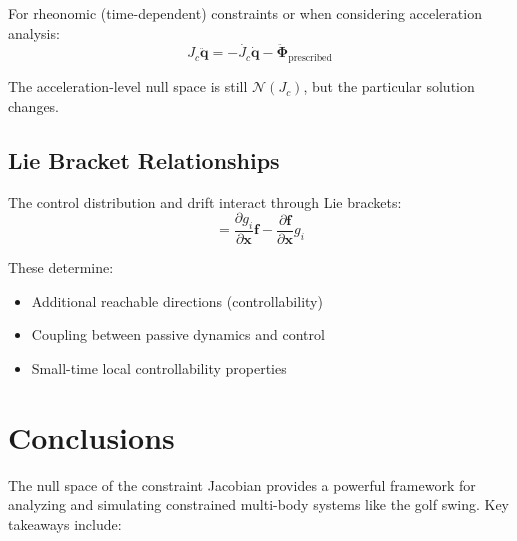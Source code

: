 \documentclass[11pt,a4paper]{article}
\theoremstyle{definition}
\newcommand{\nullspace}{\mathcal{N}}
\newcommand{\Jc}{J_c}
\newcommand{\qvec}{\bm{q}}
\newcommand{\xvec}{\bm{x}}
\newcommand{\fvec}{\bm{f}}
\newcommand{\Phivec}{\bm{\Phi}}
\begin{document}
For rheonomic (time-dependent) constraints or when considering acceleration analysis:
\begin{equation}
    \Jc \ddot{\qvec} = -\dot{\Jc} \dot{\qvec} - \ddot{\Phivec}_{\text{prescribed}}
\end{equation}

The acceleration-level null space is still $\nullspace(\Jc)$, but the particular solution changes.

\subsection{Lie Bracket Relationships}

The control distribution and drift interact through Lie brackets:
\begin{equation}
    [\fvec, g_i] = \frac{\partial g_i}{\partial \xvec} \fvec - \frac{\partial \fvec}{\partial \xvec} g_i
\end{equation}

These determine:
\begin{itemize}[noitemsep]
    \item Additional reachable directions (controllability)
    \item Coupling between passive dynamics and control
    \item Small-time local controllability properties
\end{itemize}

\section{Conclusions}

The null space of the constraint Jacobian provides a powerful framework for analyzing and simulating constrained multi-body systems like the golf swing. Key takeaways include:
\end{document}
